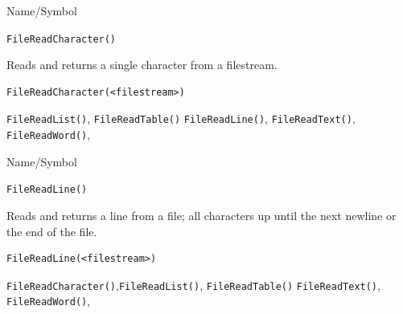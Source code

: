 \begin{desc}{Name/Symbol}
\item[Name/Symbol]	\verb+FileReadCharacter()+

\item[Description]	Reads and returns a single character from a filestream.

\item[Usage]
\begin{verbatim}
FileReadCharacter(<filestream>)
\end{verbatim}

\item[Example]	

\item[See Also]	
   \verb+FileReadList()+, \verb+FileReadTable()+
   \verb+FileReadLine()+, 	\verb+FileReadText()+, 	\verb+FileReadWord()+,

\end{desc}



\begin{desc}{Name/Symbol}
\item[Name/Symbol]	\verb+FileReadLine()+

\item[Description]	Reads and returns a line from a file; all characters up
		until the next newline or the end of the file.

\item[Usage]
\begin{verbatim}
FileReadLine(<filestream>)
\end{verbatim}

\item[Example]	

\item[See Also]	

	\verb+FileReadCharacter()+,\verb+FileReadList()+, \verb+FileReadTable()+
	\verb+FileReadText()+, 	\verb+FileReadWord()+,

\end{desc}



